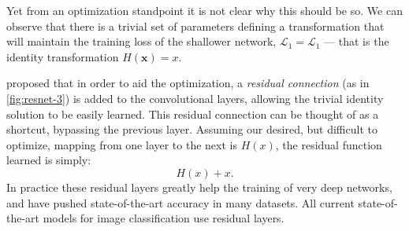 \documentclass[thesis]{subfiles}
\begin{document}
Yet from an optimization standpoint it is not clear why this should be so. We can observe that there is a trivial set of parameters defining a transformation that will maintain the training loss of the shallower network, \ie $\mathcal{L}_1 = \mathcal{L}_1$ --- that is the identity transformation $H(\mathbf{x})=x$. 

\citet{He2015} proposed that in order to aid the optimization, a \emph{residual connection} (as in \cref{fig:resnet-3}) is added to the convolutional layers, allowing the trivial identity solution to be easily learned. This residual connection can be thought of as a shortcut, bypassing the previous layer. Assuming our desired, but difficult to optimize, mapping from one layer to the next is $H(x)$, the residual function learned is simply:
\begin{equation}
	H(x) + x.
\end{equation}
%
In practice these residual layers greatly help the training of very deep networks, and have pushed state-of-the-art accuracy in many datasets. All current state-of-the-art models for image classification use residual layers.



\end{document}

